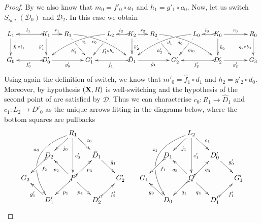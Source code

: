 \documentclass[a4paper,UKenglish,cleveref,pdftex,thm-restate,numberwithinsect]{lipics-v2021}
\def\R{\mathsf{R}}
\def\X{\textbf {\textup{X}}}
\def\G{\textbf {\textup{G}}}
\newcommand{\dder}[1]{\mathscr{#1}}
\newcommand{\der}[1]{\underline{\dder{#1}}}
\begin{document}
\begin{proof}
	By  we also know that $m_0=f'_0\circ a_1$ and $h_1=g'_1\circ a_0$. Now, let us switch $S_{i_0, i_1}(\dder{D}_0)$ and $\dder{D}_2$. In this case we obtain
	\[\xymatrix@C=15pt{L_1\ar[d]^{f_0\circ i_1}&& K_1 \ar[d]_{k'_1}\ar@{>->}[ll]_{l_1} \ar[r]^{r_1} & R_1 \ar@/^.35cm/[drrr]_(.4){c_0}|(.29)\hole \ar[dr]|(.28)\hole_{h'_1} && L_2 \ar@/_.35cm/[dlll]^(.4){c_1} \ar[dl]|(.28)\hole^{f'_1\circ b_1}& K_2 \ar[d]^{k'_2}\ar@{>->}[l]_{l_2} \ar[r]^{r_2} & R_2 \ar[dr]|(.28)\hole_{h'_2} \ar@/^.35cm/[drrr]_(.4){d_0}|(.29)\hole  && L_0 \ar@/_.35cm/[dlll]^(.4){d_1} \ar[dl]|(.28)\hole^{\hat{m}_0}& K_0 \ar[d]^{\hat{k}_0}\ar@{>->}[l]_{l_0} \ar[rr]^{r_0} && R_0 \ar[d]_{g_2\circ b_0} \\G_0 && \ar@{>->}[ll]^{f'_0} D'_0 \ar[rr]_{g'_0}&& G'_1  && \ar@{>->}[ll]^{\hat{f}_1} \hat{D}_1 \ar[rr]_{\hat{g}_1}&& G'_2 && \ar@{>->}[ll]^{f'_2} D'_2 \ar[rr]_{g'_2}&& G_3 }\]
	Using again the definition of switch, we know that $m'_0=\hat{f}_1\circ d_1$ and $h_2=g'_2\circ d_0$. Moreover, by hypothesis $(\X, \R)$ is well-switching and the hypothesis of the second point of  are satisfied by $\der{D}$. Thus we can characterise $c_0\colon R_1\to \hat{D}_1$ and $c_1\colon L_2\to D'_0$ as the unique arrows fitting in the diagrams below, where the bottom squares are pullbacks
	\[\xymatrix@R=15pt@C=15pt{&&R_1 \ar@/_1.2cm/[dddl]_(.4){a_0}|(.63)\hole\ar[dl]^{j_0}\ar[dd]^{c'_0} \ar@{>}[dr]^{c_0}&&&&&L_2 \ar[dl]^{j_1} \ar@/_1.2cm/[dddl]_(.4){z_1}|(.63)\hole\ar[dd]^{c'_1} \ar@{>}[dr]^{c_1}\\&D_2 \ar@{>->}[dl]^(.4){f_2}&&\hat{D}_1 \ar[dr]^{\hat{g}_1}  &&&D_1 \ar@{>->}[dl]^(.4){f_1}&&D'_0 \ar[dr]^{g'_0}\\G_2 && P\ar[dr]_{p_4} \ar@{>->}[ur]_{p_3}\ar@{>->}[dl]^{p_1} \ar[ul]^{p_2}&&G'_2&G_1 && Q\ar[dr]_{q_4} \ar@{>->}[ur]_{q_3}\ar@{>->}[dl]^{q_1} \ar[ul]^{q_2}&&G'_1\\& D'_1 \ar[ul]^{g'_1}&&D'_2 \ar@{>->}[ur]_{f'_2}&&& D_0 \ar[ul]^{g_0}&&D'_1 \ar@{>->}[ur]_{f'_1}}\]
	

\end{proof}
\end{document}
